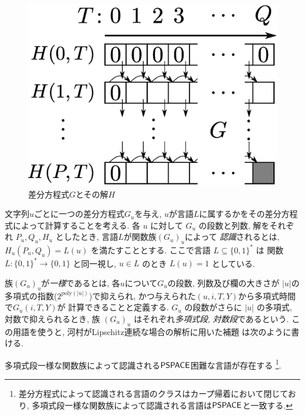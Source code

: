 \begin{figure}
 \begin{center}
  \includegraphics[height=0.2\textheight]{image/divp.eps}
 \end{center}
 \caption{差分方程式$G$とその解$H$}
 \label{fig:divp}
\end{figure}

文字列$u$ごとに一つの差分方程式$G _u$を与え,
$u$が言語$L$に属するかをその差分方程式によって計算することを考える.
各 $u$ に対して $G_u$ の段数と列数, 解をそれぞれ $P_u, Q_u, H_u$ としたとき,
言語$L$が関数族$(G_u)_u$によって
\emph{認識}されるとは,
$H_u(P_u, Q_u) = L(u)$ を満たすこととする.
ここで言語 $L \subseteq \{0, 1\} ^*$ は
関数 $L \colon \{0, 1\} ^* \to \{0, 1\}$ と同一視し, 
$u \in L$ のとき $L (u) = 1$ としている. 

族$(G_u)_u$が\emph{一様}であるとは,
各$u$について$G _u$の段数, 列数及び欄の大きさが
$|u|$の多項式の指数($2^{\mathrm{poly} (|u|)}$)で抑えられ, 
かつ与えられた$(u, i, T, Y)$から多項式時間で$G_u(i, T, Y)$が
計算できることと定義する.
$G_u$ の段数がさらに $|u|$ の多項式, 対数で抑えられるとき, 
族 $(G_u) _u$ はそれぞれ\emph{多項式段}, \emph{対数段}であるという. 
この用語を使うと, 
河村がLipschitz連続な場合の解析に用いた補題
\cite[補題4.7]{kawamura2010lipschitz}は次のように書ける. 

\begin{lemma}
 \label{DIVPpolyIsPSPACEhard}
 多項式段一様な関数族によって認識される$\mathsf{PSPACE}$困難な言語が存在する
 \footnote{差分方程式によって認識される言語のクラスはカープ帰着において閉じており,
多項式段一様な関数族によって認識される言語は$\mathsf{PSPACE}$と一致する.}.
\end{lemma}

